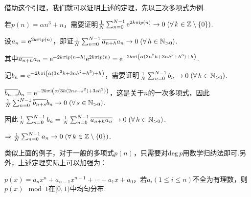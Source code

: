 借助这个引理，我们就可以证明上述的定理，先以三次多项式为例.
\begin{instance}
    若$p(n)=\alpha n^3+n$，需要证明$\frac{1}{N}\sum_{n=0}^{N-1}{\mathrm{e}^{2k\pi \mathrm{i} p(n)}}\to 0\;(\forall\, k\in\mathbb{Z}\setminus\{0\})$.\par
    设$a_n=\mathrm{e}^{2k\pi \mathrm{i} p(n)}$，即证$\frac{1}{N}\sum_{n=0}^{N-1}{\overline{a_{n+h}}a_n}\to 0\;(\forall\, h\in\mathbb{N}_{>0})$. \par
    其中$\overline{a_{n+h}}a_n=\mathrm{e}^{-2k\pi \mathrm{i} p(n+h)}\mathrm{e}^{2k\pi \mathrm{i} p(n)}=\mathrm{e}^{-2k\pi \mathrm{i} \left(\alpha(3n^2h+3nh^2+h^3)+h\right)}$.\par
    记$b_n=\mathrm{e}^{-2k\pi \mathrm{i} \left(\alpha(3n^2h+3nh^2+h^3)+h\right)}$，需要证明$\frac{1}{N}\sum_{n=0}^{N-1}{b_n}\to 0\;(\forall\, h\in\mathbb{N}_{>0})$.\par
    $\overline{b_{n+s}}b_n=\mathrm{e}^{-2k\pi\mathrm{i} \left(\alpha(3h(2ns+s^2)+3sh^2)\right)}$，这是关于$n$的一次多项式，因此$\frac{1}{N}\sum_{n=0}^{N-1}{\overline{b_{n+s}}b_n}\to 0\;(\forall\, s\in\mathbb{N}_{>0})$.\par
    因此$\frac{1}{N}\sum_{n=0}^{N-1}b_n=\frac{1}{N}\sum_{n=0}^{N-1}{\overline{a_{n+h}a_n}}\to 0\;(\forall\,h\in\mathbb{N}_{>0})$. \par
    $\Rightarrow \frac{1}{N}\sum_{n=0}^{N-1}{a_n}\to 0\;(\forall\, k\in\mathbb{Z}\setminus\{0\})$.
\end{instance}
类似上面的例子，对于一般的多项式$p(n)$，只需要对$\mathrm{deg}\, p$用数学归纳法即可.另外，上述定理实际上可以加强为：
\begin{theorem}{}
    $p(x)=a_nx^n+a_{n-1}x^{n-1}+\cdots+a_1x+a_0$，若$a_i(1\leq i\leq n)$不全为有理数，则$p(x)\mod 1$在$[0,1)$中均匀分布.
\end{theorem}
